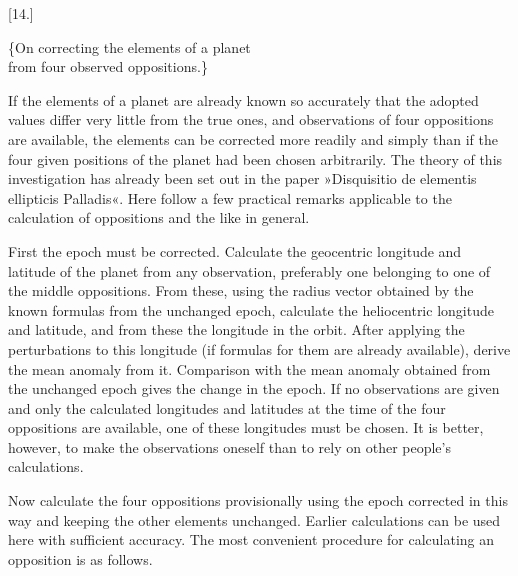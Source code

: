 \begin{center}
[14.]
\end{center}
\begin{center}
\{On correcting the elements of a planet\\from four observed oppositions.\}
\end{center}
If the elements of a planet are already known so accurately that the adopted values differ very little from the true ones, and observations of four oppositions are available, the elements can be corrected more readily and simply than if the four given positions of the planet had been chosen arbitrarily. The theory of this investigation has already been set out in the paper »Disquisitio de elementis ellipticis Palladis«. Here follow a few practical remarks applicable to the calculation of oppositions and the like in general.

First the epoch must be corrected. Calculate the geocentric longitude and latitude of the planet from any observation, preferably one belonging to one of the middle oppositions. From these, using the radius vector obtained by the known formulas from the unchanged epoch, calculate the heliocentric longitude and latitude, and from these the longitude in the orbit. After applying the perturbations to this longitude (if formulas for them are already available), derive the mean anomaly from it. Comparison with the mean anomaly obtained from the unchanged epoch gives the change in the epoch. If no observations are given and only the calculated longitudes and latitudes at the time of the four oppositions are available, one of these longitudes must be chosen. It is better, however, to make the observations oneself than to rely on other people's calculations.

Now calculate the four oppositions provisionally using the epoch corrected in this way and keeping the other elements unchanged. Earlier calculations can be used here with sufficient accuracy. The most convenient procedure for calculating an opposition is as follows.

